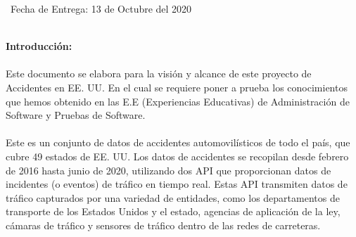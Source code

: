 \documentclass[40pt]{article}
\begin{document}
\maketitle
\textsf{\ Fecha de Entrega: 13 de Octubre del 2020 \\}

\newpage

\maketitle
\textsf{\ \\
\textbf{Introducción:}\\
\\
Este documento se elabora para la visión y alcance de este proyecto de Accidentes en EE. UU. En el cual se requiere poner a prueba los conocimientos que hemos obtenido en las E.E (Experiencias Educativas) de Administración de Software y Pruebas de Software.\\
\\
Este es un conjunto de datos de accidentes automovilísticos de todo el país, que cubre 49 estados de EE. UU. Los datos de accidentes se recopilan desde febrero de 2016 hasta junio de 2020, utilizando dos API que proporcionan datos de incidentes (o eventos) de tráfico en tiempo real. Estas API transmiten datos de tráfico capturados por una variedad de entidades, como los departamentos de transporte de los Estados Unidos y el estado, agencias de aplicación de la ley, cámaras de tráfico y sensores de tráfico dentro de las redes de carreteras. \\}
\end{document}

